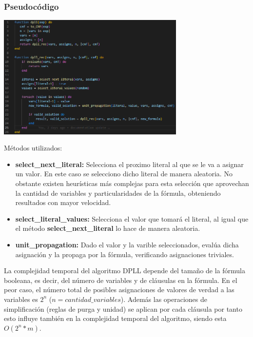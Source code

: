 \documentclass{article}
\begin{document}
            \subsubsection*{Pseudocódigo}
                \includegraphics[width = 0.7\textwidth]{resources/code2.png}

                Métodos utilizados:
                \begin{itemize}
                    \item \textbf{select\_next\_literal:} Selecciona el proximo literal al que se le va a asignar un valor. En este caso se selecciono
                    dicho literal de manera aleatoria. No obstante existen heurísticas más complejas para esta selección que aprovechan la cantidad de 
                    variables y particularidades de la fórmula, obteniendo resultados con mayor velocidad.
                    \item \textbf{select\_literal\_values:} Selecciona el valor que tomará el literal, al igual que el método
                     \textbf{select\_next\_literal} lo hace de manera aleatoria.
                    \item \textbf{unit\_propagation:} Dado el valor y la varible seleccionados, evalúa dicha asignación y la propaga por la fórmula, 
                    verificando asignaciones triviales.
                \end{itemize}

                La complejidad temporal del algoritmo DPLL depende del tamaño de la fórmula booleana, es decir, del 
                número de variables y de cláusulas en la fórmula. En el peor caso, el número total de posibles asignaciones de 
                valores de verdad a las variables es $2^n$ ($n=cantidad\_variables$). Además las operaciones de simplificación
                (reglas de purga y unidad) se aplican por cada cláusula por tanto esto influye también en la complejidad temporal
                del algoritmo, siendo esta $O(2^n*m)$.
\end{document}
